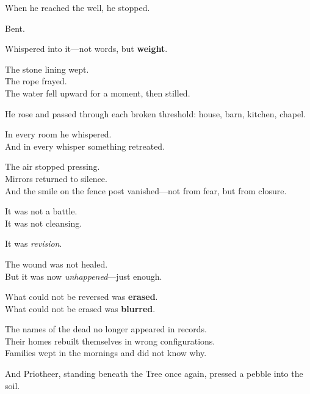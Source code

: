 \documentclass[12pt]{article}
\begin{document}
\vspace{0.5em}
When he reached the well, he stopped.

\vspace{0.5em}
Bent.

\vspace{0.5em}
Whispered into it---not words, but \textbf{weight}.

\vspace{0.5em}
The stone lining wept.\\
The rope frayed.\\
The water fell upward for a moment, then stilled.

\vspace{0.5em}
He rose and passed through each broken threshold: house, barn, kitchen, chapel.

\vspace{0.5em}
In every room he whispered.\\
And in every whisper something retreated.

\vspace{0.5em}
The air stopped pressing.\\
Mirrors returned to silence.\\
And the smile on the fence post vanished---not from fear, but from closure.

\vspace{0.5em}
It was not a battle.\\
It was not cleansing.

\vspace{0.5em}
It was \textit{revision}.

\vspace{0.5em}
The wound was not healed.\\
But it was now \textit{unhappened}---just enough.

\vspace{0.5em}
What could not be reversed was \textbf{erased}.\\
What could not be erased was \textbf{blurred}.

\vspace{0.5em}
The names of the dead no longer appeared in records.\\
Their homes rebuilt themselves in wrong configurations.\\
Families wept in the mornings and did not know why.

\vspace{0.5em}
And Priotheer, standing beneath the Tree once again, pressed a pebble into the soil.
\end{document}
